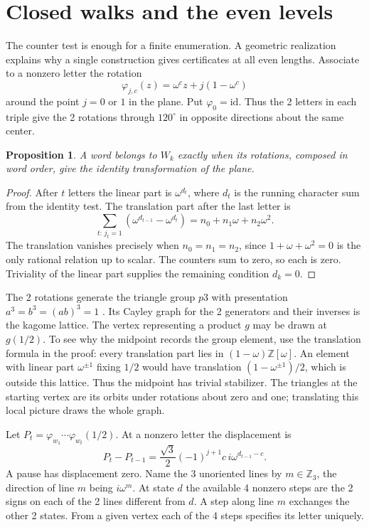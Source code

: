 \documentclass[11pt,a4paper]{amsart}
\newtheorem{proposition}[theorem]{Proposition}
\begin{document}
\section{Closed walks and the even levels}\label{sec:walks}

The counter test is enough for a finite enumeration. A geometric realization explains why a single construction gives certificates at all even lengths. Associate to a nonzero letter the rotation
\[
 \varphi_{j,c}(z)=\omega^c z+j(1-\omega^c)
\]
around the point $j=0$ or $1$ in the plane. Put $\varphi_0=\mathrm{id}$. Thus the 2 letters in each triple give the 2 rotations through $120^\circ$ in opposite directions about the same center.

\begin{proposition}\label{prop:walks}
A word belongs to $W_k$ exactly when its rotations, composed in word order, give the identity transformation of the plane.
\end{proposition}
\begin{proof}
After $t$ letters the linear part is $\omega^{d_t}$, where $d_t$ is the running character sum from the identity test. The translation part after the last letter is
\[
 \sum_{t:\,j_t=1}(\omega^{d_{t-1}}-\omega^{d_t})
     = n_0+n_1\omega+n_2\omega^2 .
\]
The translation vanishes precisely when $n_0=n_1=n_2$, since $1+\omega+\omega^2=0$ is the only rational relation up to scalar. The counters sum to zero, so each is zero. Triviality of the linear part supplies the remaining condition $d_k=0$.
\end{proof}

The 2 rotations generate the triangle group $p3$ with presentation $a^3=b^3=(ab)^3=1$ \cite{cmo}. Its Cayley graph for the 2 generators and their inverses is the kagome lattice. The vertex representing a product $g$ may be drawn at $g(1/2)$. To see why the midpoint records the group element, use the translation formula in the proof: every translation part lies in $(1-\omega)\mathbb Z[\omega]$. An element with linear part $\omega^{\pm1}$ fixing $1/2$ would have translation $(1-\omega^{\pm1})/2$, which is outside this lattice. Thus the midpoint has trivial stabilizer. The triangles at the starting vertex are its orbits under rotations about zero and one; translating this local picture draws the whole graph.

Let $P_t=\varphi_{w_1}\cdots\varphi_{w_t}(1/2)$. At a nonzero letter the displacement is
\[
 P_t-P_{t-1}=\frac{\sqrt3}{2}(-1)^{j+1}c\,i\omega^{d_{t-1}-c}.
\]
A pause has displacement zero. Name the 3 unoriented lines by $m\in\mathbb Z_3$, the direction of line $m$ being $i\omega^m$. At state $d$ the available 4 nonzero steps are the 2 signs on each of the 2 lines different from $d$. A step along line $m$ exchanges the other 2 states. From a given vertex each of the 4 steps specifies its letter uniquely.
\end{document}
